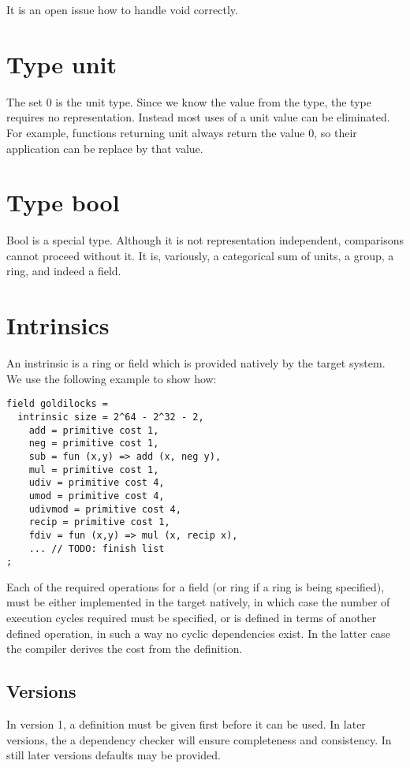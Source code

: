 \documentclass[oneside]{book}
\theoremstyle{plain}
\theoremstyle{definition}
\theoremstyle{plain}
\begin{document}
It is an open issue how to handle void correctly.

\section{Type unit}
The set ${0}$ is the unit type. Since we know the value from the type,
the type requires no representation. Instead most uses of a unit value
can be eliminated. For example, functions returning unit always return
the value 0, so their application can be replace by that value.

\section{Type bool}
Bool is a special type. Although it is not representation independent,
comparisons cannot proceed without it. It is, variously, a categorical
sum of units, a group, a ring, and indeed a field.



\section{Intrinsics}
An instrinsic is a ring or field which is provided natively by the target system.
We use the following example to show how:
\begin{verbatim}
field goldilocks = 
  intrinsic size = 2^64 - 2^32 - 2, 
    add = primitive cost 1,
    neg = primitive cost 1,
    sub = fun (x,y) => add (x, neg y),
    mul = primitive cost 1,
    udiv = primitive cost 4,
    umod = primitive cost 4,
    udivmod = primitive cost 4,
    recip = primitive cost 1,
    fdiv = fun (x,y) => mul (x, recip x),
    ... // TODO: finish list
;
\end{verbatim}
Each of the required operations for a field (or ring if a ring is being specified),
must be either implemented in the target natively, in which case the number of
execution cycles required must be specified, or is defined in terms of another
defined operation, in such a way no cyclic dependencies exist. In the latter case
the compiler derives the cost from the definition.

\subsection{Versions}
In version 1, a definition must be given first before it can be used.
In later versions, the a dependency checker will ensure completeness
and consistency. In still later versions defaults may be provided.
\end{document}
